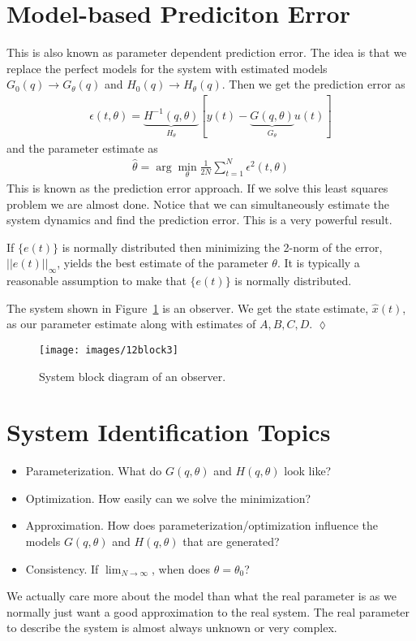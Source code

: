 \section{Model-based Prediciton Error}
This is also known as parameter dependent prediction error.
The idea is that we replace the perfect models for the system with estimated models $G_0(q)\rightarrow G_\theta(q)$ and $H_0(q)\rightarrow H_\theta(q)$.
Then we get the prediction error as
\begin{align}
\boxed{\epsilon(t,\theta) = \underbrace{H^{-1}(q,\theta)}_{H_\theta}[y(t)-\underbrace{G(q,\theta)}_{G_\theta}u(t)]}
\end{align}
and the parameter estimate as
\begin{align}
\boxed{\hat{\theta} = \arg\min_{\theta}\frac{1}{2N}\sum_{t=1}^N\epsilon^2(t,\theta)}
\end{align}
This is known as the prediction error approach.
If we solve this least squares problem we are almost done.
Notice that we can simultaneously estimate the system dynamics and find the prediction error.
This is a very powerful result.

If $\{e(t)\}$ is normally distributed then minimizing the 2-norm of the error, $||e(t)||_\infty$, yields the best estimate of the parameter $\theta$.
It is typically a reasonable assumption to make that $\{e(t)\}$ is normally distributed.

\begin{example}
The system shown in Figure~\ref{fig:12block3} is an observer.
We get the state estimate, $\hat{x}(t)$, as our parameter estimate along with estimates of $A,B,C,D$.
$\lozenge$
\end{example}

\begin{figure}[ht!]
\centering
\texttt{[image: images/12block3]}
\caption{System block diagram of an observer.}%
\label{fig:12block3}
\end{figure}

\section{System Identification Topics}
\begin{itemize}
\item Parameterization. What do $G(q,\theta)$ and $H(q,\theta)$ look like?
\item Optimization. How easily can we solve the minimization?
\item Approximation. How does parameterization/optimization influence the models $G(q,\theta)$ and $H(q,\theta)$ that are generated?
\item Consistency. If $\lim_{N\to\infty}$, when does $\theta=\theta_0$?
\end{itemize}
We actually care more about the model than what the real parameter is as we normally just want a good approximation to the real system.
The real parameter to describe the system is almost always unknown or very complex.

